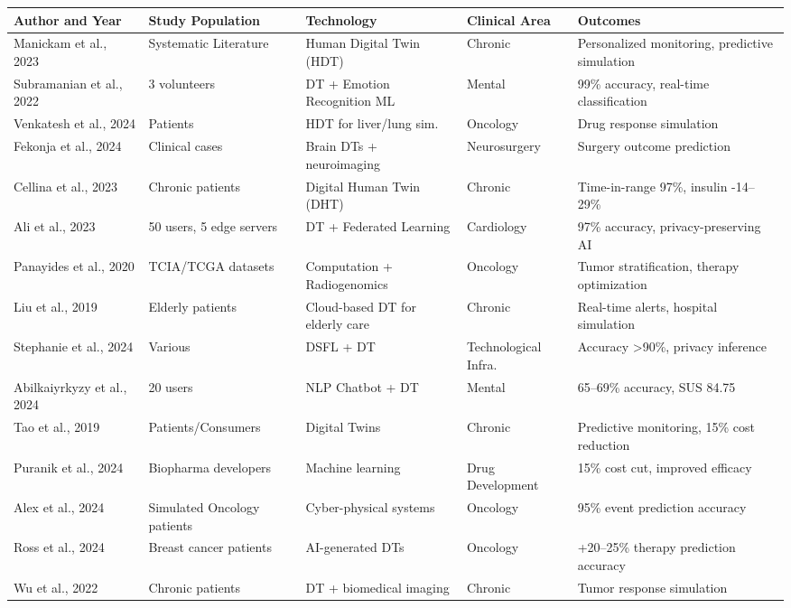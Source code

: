 \documentclass[10pt,a4paper]{article}
\begin{document}
\begin{small}
\begin{longtable}{|p{3.5cm}|p{2.8cm}|p{2.8cm}|p{2cm}|p{3.2cm}|}
\hline
\textbf{Author and Year} & \textbf{Study Population} & \textbf{Technology} & \textbf{Clinical Area} & \textbf{Outcomes} \\
\hline
Manickam et al., 2023 & Systematic Literature & Human Digital Twin (HDT) & Chronic & Personalized monitoring, predictive simulation \\
Subramanian et al., 2022 & 3 volunteers & DT + Emotion Recognition ML & Mental & 99\% accuracy, real-time classification \\
Venkatesh et al., 2024 & Patients & HDT for liver/lung sim. & Oncology & Drug response simulation \\
Fekonja et al., 2024 & Clinical cases & Brain DTs + neuroimaging & Neurosurgery & Surgery outcome prediction \\
Cellina et al., 2023 & Chronic patients & Digital Human Twin (DHT) & Chronic & Time-in-range 97\%, insulin -14–29\% \\
Ali et al., 2023 & 50 users, 5 edge servers & DT + Federated Learning & Cardiology & 97\% accuracy, privacy-preserving AI \\
Panayides et al., 2020 & TCIA/TCGA datasets & Computation + Radiogenomics & Oncology & Tumor stratification, therapy optimization \\
Liu et al., 2019 & Elderly patients & Cloud-based DT for elderly care & Chronic & Real-time alerts, hospital simulation \\
Stephanie et al., 2024 & Various & DSFL + DT & Technological Infra. & Accuracy >90\%, privacy inference \\
Abilkaiyrkyzy et al., 2024 & 20 users & NLP Chatbot + DT & Mental & 65–69\% accuracy, SUS 84.75 \\
Tao et al., 2019 & Patients/Consumers & Digital Twins & Chronic & Predictive monitoring, 15\% cost reduction \\
Puranik et al., 2024 & Biopharma developers & Machine learning & Drug Development & 15\% cost cut, improved efficacy \\
Alex et al., 2024 & Simulated Oncology patients & Cyber-physical systems & Oncology & 95\% event prediction accuracy \\
Ross et al., 2024 & Breast cancer patients & AI-generated DTs & Oncology & +20–25\% therapy prediction accuracy \\
Wu et al., 2022 & Chronic patients & DT + biomedical imaging & Chronic & Tumor response simulation \\

\end{longtable}
\end{small}
\end{document}
